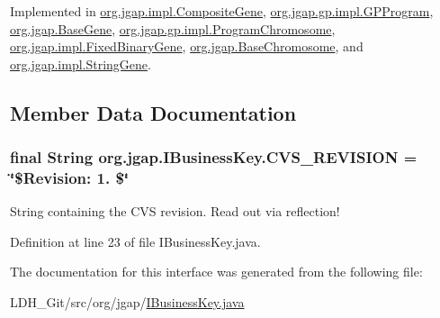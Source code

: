 Implemented in \hyperlink{classorg_1_1jgap_1_1impl_1_1_composite_gene_a0e0046a81c4adb9ff4d444c37e092b30}{org.\-jgap.\-impl.\-Composite\-Gene}, \hyperlink{classorg_1_1jgap_1_1gp_1_1impl_1_1_g_p_program_aef41b8fda92d9d1b3607ed7d16243468}{org.\-jgap.\-gp.\-impl.\-G\-P\-Program}, \hyperlink{classorg_1_1jgap_1_1_base_gene_ac4e7c0fad73465365953b375cfa802a8}{org.\-jgap.\-Base\-Gene}, \hyperlink{classorg_1_1jgap_1_1gp_1_1impl_1_1_program_chromosome_a88f1eb9dac4272ec7f7274f0cd66d763}{org.\-jgap.\-gp.\-impl.\-Program\-Chromosome}, \hyperlink{classorg_1_1jgap_1_1impl_1_1_fixed_binary_gene_a028399260d741704b157bfdd0d411a3a}{org.\-jgap.\-impl.\-Fixed\-Binary\-Gene}, \hyperlink{classorg_1_1jgap_1_1_base_chromosome_aa35172e2b9535ace3b8fa31c1b2ef2fe}{org.\-jgap.\-Base\-Chromosome}, and \hyperlink{classorg_1_1jgap_1_1impl_1_1_string_gene_a8cab2846ca49b7aa6d6c23a028aded45}{org.\-jgap.\-impl.\-String\-Gene}.



\subsection{Member Data Documentation}
\hypertarget{interfaceorg_1_1jgap_1_1_i_business_key_a6d43b687da0842739b8021f466ca451a}{
\subsubsection[{C\-V\-S\-\_\-\-R\-E\-V\-I\-S\-I\-O\-N}]{\setlength{\rightskip}{0pt plus 5cm}final String org.\-jgap.\-I\-Business\-Key.\-C\-V\-S\-\_\-\-R\-E\-V\-I\-S\-I\-O\-N = \char`\"{}\$Revision\-: 1. \$\char`\"{}\hspace{0.3cm}{\ttfamily [static]}}}\label{interfaceorg_1_1jgap_1_1_i_business_key_a6d43b687da0842739b8021f466ca451a}
String containing the C\-V\-S revision. Read out via reflection! 

Definition at line 23 of file I\-Business\-Key.\-java.



The documentation for this interface was generated from the following file\-:\begin{DoxyCompactItemize}
\item 
L\-D\-H\-\_\-\-Git/src/org/jgap/\hyperlink{_i_business_key_8java}{I\-Business\-Key.\-java}\end{DoxyCompactItemize}
